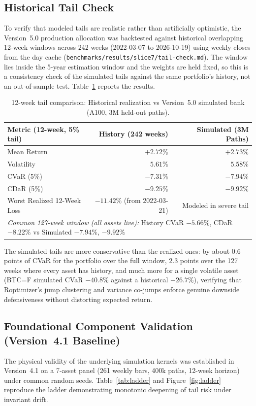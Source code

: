 \documentclass[11pt]{article}
\begin{document}
\subsection{Historical Tail Check}
To verify that modeled tails are realistic rather than artificially optimistic, the Version~5.0 production
allocation was backtested against historical overlapping 12-week windows across 242 weeks (2022-03-07 to 2026-10-19)
using weekly closes from the day cache (\nolinkurl{benchmarks/results/slice7/tail-check.md}). The window lies
inside the 5-year estimation window and the weights are held fixed, so this is a consistency check of the
simulated tails against the same portfolio's history, not an out-of-sample test. Table~\ref{tab:tailcheck}
reports the results.

\begin{table}[H]
\centering
\caption{12-week tail comparison: Historical realization vs Version~5.0 simulated bank (A100,
3M held-out paths).}
\label{tab:tailcheck}
\small
\setlength{\tabcolsep}{5pt}
\begin{tabular}{lrr}
\toprule
Metric (12-week, 5\% tail) & History (242 weeks) & Simulated (3M Paths) \\
\midrule
Mean Return & $+2.72\%$ & $+2.73\%$ \\
Volatility & $5.61\%$ & $5.58\%$ \\
CVaR (5\%) & $-7.31\%$ & $-7.94\%$ \\
CDaR (5\%) & $-9.25\%$ & $-9.92\%$ \\
Worst Realized 12-Week Loss & $-11.42\%$ (from 2022-03-21) & Modeled in severe tail \\
\midrule
\multicolumn{3}{p{11.5cm}}{\emph{Common 127-week window (all assets live):} History CVaR $-5.66\%$, CDaR $-8.22\%$ vs Simulated $-7.94\%$, $-9.92\%$} \\
\bottomrule
\end{tabular}
\end{table}

\noindent The simulated tails are more conservative than the realized ones: by about 0.6 points of CVaR for the
portfolio over the full window, 2.3 points over the 127 weeks where every asset has history, and much more for a
single volatile asset (BTC=F simulated CVaR $-40.8\%$ against a historical $-26.7\%$), verifying that Roptimizer's jump clustering and variance
co-jumps enforce genuine downside defensiveness without distorting expected return.

\subsection{Foundational Component Validation (Version~4.1 Baseline)}
The physical validity of the underlying simulation kernels was established in Version~4.1 on a 7-asset panel
(261 weekly bars, 400k paths, 12-week horizon) under common random seeds. Table~\ref{tab:ladder} and
Figure~\ref{fig:ladder} reproduce the ladder demonstrating monotonic deepening of tail risk under invariant drift.
\end{document}
